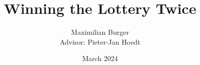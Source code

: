 \documentclass{article}
\title{Winning the Lottery Twice}
\author{Maximilian Burger\\{\small Advisor: Pieter-Jan Hoedt}}
\date{March 2024}
\begin{document}
\sffamily

\maketitle








\printbibliography
\end{document}
